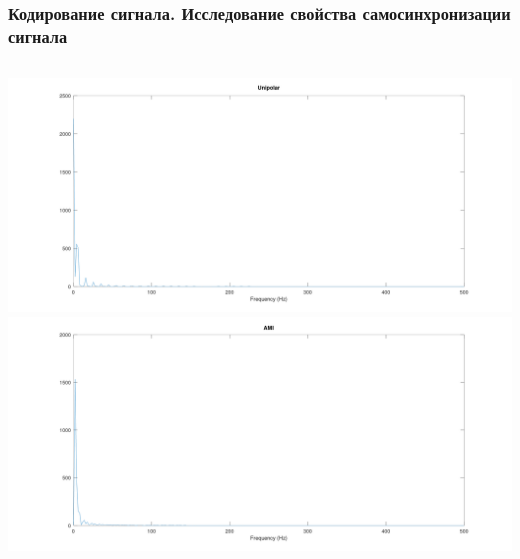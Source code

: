 \begin{frame}
\frametitle{Кодирование сигнала. Исследование свойства самосинхронизации сигнала}
\begin{columns}
            \includegraphics[width=\textwidth]{../octave/coding/spectre/unipolar.png}
            \includegraphics[width=\textwidth]{../octave/coding/spectre/ami.png}
\end{columns}
\end{frame}

